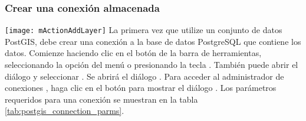 \subsubsection{Crear una conexi\'on almacenada}\label{sec:postgis_stored}

\texttt{[image: mActionAddLayer]} La primera vez que utilize un conjunto de datos PostGIS, debe crear una conexi\'on a la base de datos PostgreSQL que contiene los datos. Comienze haciendo clic en el bot\'on  de la barra de herramientas, seleccionando la opci\'on 
 del men\'u  o presionando la tecla . También puede abrir el di\'alogo  y seleccionar .
Se abrir\'a el di\'alogo . Para acceder al administrador de conexiones , haga clic en el bot\'on  para mostrar el di\'alogo  . Los par\'ametros requeridos para una conexi\'on se muestran en la tabla \ref{tab:postgis_connection_parms}.

